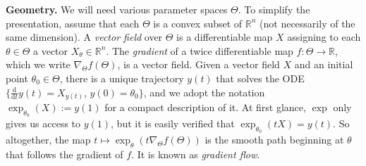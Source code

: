 \textbf{Geometry.}
We will need various parameter spaces $\Theta$.
    To simplify the presentation, assume that each $\Theta$ is a convex subset of $\mathbb R^n$ (not necessarily of the same dimension).
A \emph{vector field} over $\Theta$ is a differentiable
    map $X$ assigning to each $\theta \in \Theta$ a vector $X_\theta \in \mathbb R^n$.
The \emph{gradient} of a twice differentiable map $f : \Theta \to \mathbb R$,
    which we write $\nabla_\Theta f(\Theta)$, is a vector field.
Given a vector field  $X$ and an initial point $\theta_0 \in \Theta$, there is a unique trajectory $y(t)$ that solves the ODE
$\{\frac{\mathrm d }{\mathrm d t}y(t) = X_{y(t)}$,  $y(0) = \theta_0\}$,
and we adopt the notation $\exp_{\theta_0}( X ) := y(1)$
    for a compact description of it.
At first glance,
 $\exp$ only gives us access to $y(1)$,
    but
     it is easily verified
     that $\exp_{\theta_0}(t X) = y(t)$.
So altogether, the map $t\mapsto \exp_\theta(t \nabla_\Theta f(\Theta))$ is the smooth path beginning at $\theta$ that follows the gradient of $f$. It is known as
\emph{gradient flow}.


